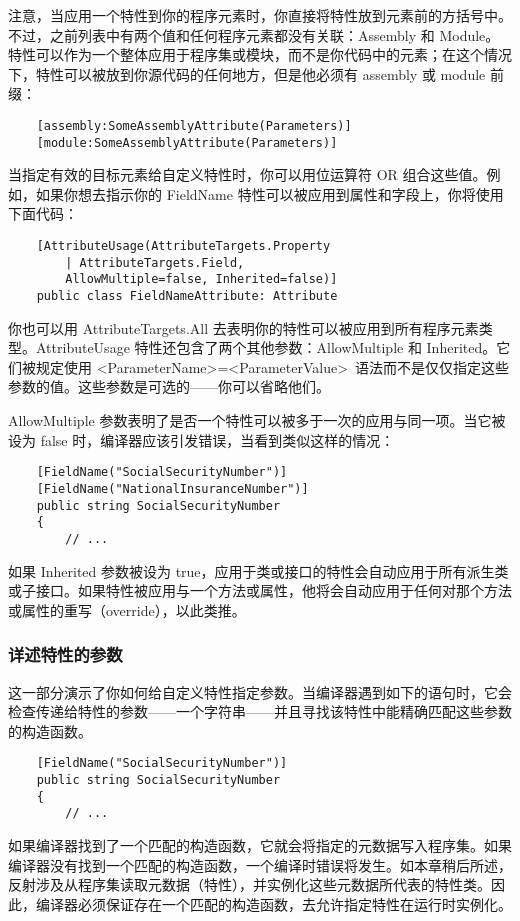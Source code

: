 注意，当应用一个特性到你的程序元素时，你直接将特性放到元素前的方括号中。不过，之前列表中有两个值和任何程序元素都没有关联：Assembly 和 Module。特性可以作为一个整体应用于程序集或模块，而不是你代码中的元素；在这个情况下，特性可以被放到你源代码的任何地方，但是他必须有 assembly 或 module 前缀：
\begin{verbatim}
    [assembly:SomeAssemblyAttribute(Parameters)]
    [module:SomeAssemblyAttribute(Parameters)]
\end{verbatim}
当指定有效的目标元素给自定义特性时，你可以用位运算符 OR 组合这些值。例如，如果你想去指示你的 FieldName 特性可以被应用到属性和字段上，你将使用下面代码：
\begin{verbatim}
    [AttributeUsage(AttributeTargets.Property
        | AttributeTargets.Field,
        AllowMultiple=false, Inherited=false)]
    public class FieldNameAttribute: Attribute
\end{verbatim}
你也可以用 AttributeTargets.All 去表明你的特性可以被应用到所有程序元素类型。AttributeUsage 特性还包含了两个其他参数：AllowMultiple 和 Inherited。它们被规定使用 \textless ParameterName\textgreater =\textless ParameterValue\textgreater\ 语法而不是仅仅指定这些参数的值。这些参数是可选的——你可以省略他们。

AllowMultiple 参数表明了是否一个特性可以被多于一次的应用与同一项。当它被设为 false 时，编译器应该引发错误，当看到类似这样的情况：
\begin{verbatim}
    [FieldName("SocialSecurityNumber")]
    [FieldName("NationalInsuranceNumber")]
    public string SocialSecurityNumber
    {
        // ...
\end{verbatim}
如果 Inherited 参数被设为 true，应用于类或接口的特性会自动应用于所有派生类或子接口。如果特性被应用与一个方法或属性，他将会自动应用于任何对那个方法或属性的重写（override），以此类推。

\subsubsection{详述特性的参数}
这一部分演示了你如何给自定义特性指定参数。当编译器遇到如下的语句时，它会检查传递给特性的参数——一个字符串——并且寻找该特性中能精确匹配这些参数的构造函数。
\begin{verbatim}
    [FieldName("SocialSecurityNumber")]
    public string SocialSecurityNumber
    {
        // ...
\end{verbatim}
如果编译器找到了一个匹配的构造函数，它就会将指定的元数据写入程序集。如果编译器没有找到一个匹配的构造函数，一个编译时错误将发生。如本章稍后所述，反射涉及从程序集读取元数据（特性），并实例化这些元数据所代表的特性类。因此，编译器必须保证存在一个匹配的构造函数，去允许指定特性在运行时实例化。


